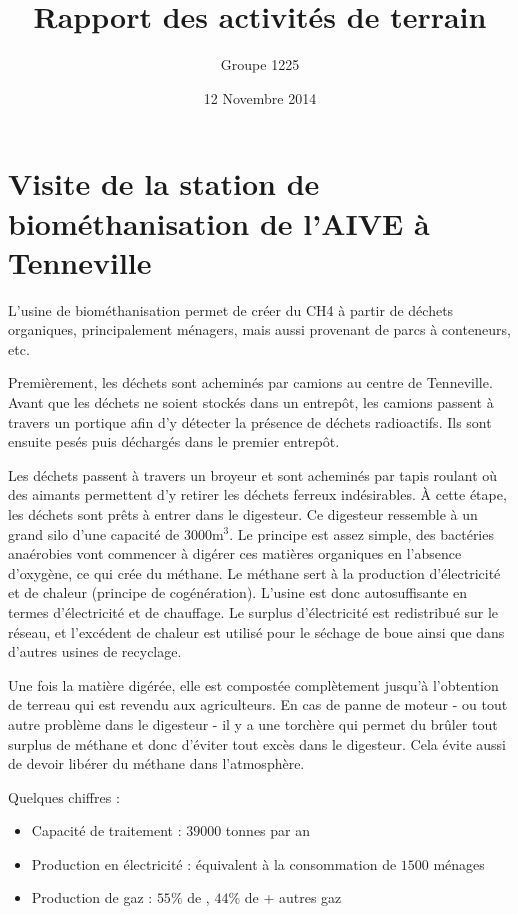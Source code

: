 \documentclass[a4paper, oneside, 12pt]{article}
\title{Rapport des activités de terrain}
\author{Groupe 1225}
\date{12 Novembre 2014}
\begin{document}
\maketitle

\section{Visite de la station de biométhanisation de l’AIVE à Tenneville}

L’usine de biométhanisation permet de créer du CH4 à partir de déchets organiques,
principalement ménagers, mais aussi provenant de parcs à conteneurs, etc.

Premièrement, les déchets sont acheminés par camions au centre de Tenneville.
Avant que les déchets ne soient stockés dans un entrepôt, les camions passent à travers un portique afin 
d'y détecter la présence de déchets radioactifs. Ils sont ensuite pesés
puis déchargés dans le premier entrepôt.

Les déchets passent à travers un broyeur et sont acheminés par tapis roulant 
où des aimants permettent d’y retirer les déchets ferreux indésirables.
À cette étape, les déchets sont prêts à entrer dans le digesteur. 
Ce digesteur ressemble à un grand silo d’une capacité de $3000 \si{\meter\cubed}$.
Le principe est assez simple, des bactéries anaérobies vont commencer à digérer 
ces matières organiques en l’absence d’oxygène, ce qui crée du méthane. 
Le méthane sert à la production d’électricité et de chaleur (principe de cogénération).
L’usine est donc autosuffisante en termes d'électricité et de chauffage.
Le surplus  d’électricité est redistribué sur le réseau, et l’excédent de chaleur 
est utilisé pour le séchage de boue ainsi que dans d’autres usines de recyclage. 

Une fois la matière digérée, elle est compostée complètement jusqu’à l’obtention 
de terreau qui est revendu aux agriculteurs.
En cas de panne de moteur - ou tout autre problème dans le digesteur -
il y a une torchère qui permet du brûler tout surplus de méthane
et donc d'éviter tout excès dans le digesteur. Cela évite aussi de devoir 
libérer du méthane dans l’atmosphère.

Quelques chiffres :
\begin{itemize}
	\item Capacité de traitement : $39 000$ tonnes par an
	\item Production en électricité : équivalent à la consommation de $1500$ ménages
	\item Production de gaz : $55\%$ de , $44\%$ de  + autres gaz
\end{itemize}
\end{document}
